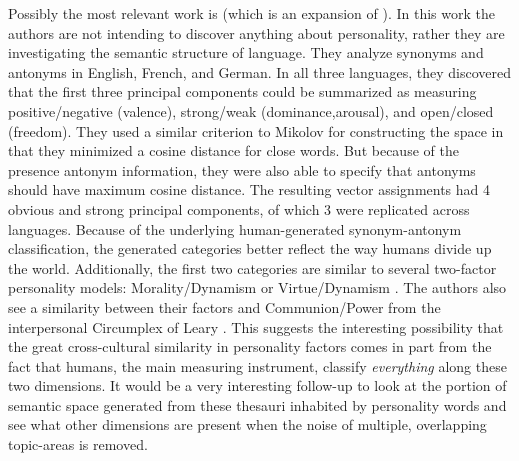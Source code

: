 Possibly the most relevant work is \citep{Samsonovich2010} (which is an
expansion of \citep{Samsonovich2007}). In this work the authors are not
intending to discover anything about personality, rather they are investigating 
the semantic structure of language. They
analyze synonyms and antonyms in English, French, and German. In all three
languages, they discovered that the first three principal components could be
summarized as measuring positive/negative (valence), strong/weak 
(dominance,arousal), and open/closed (freedom). They used a similar criterion
to Mikolov for constructing the space in that they minimized a cosine distance
for close words. But because of the presence antonym information, they were
also able to specify that antonyms should have maximum cosine distance.
The resulting vector assignments had 4 obvious and strong principal
components, of which 3 were replicated across languages. Because of the
underlying human-generated synonym-antonym classification, the generated
categories better reflect the way humans divide up the world. Additionally,
the first two categories are similar to several two-factor personality models:
Morality/Dynamism 
or Virtue/Dynamism . The authors also
see a similarity between their factors and Communion/Power from the 
interpersonal Circumplex of Leary . This suggests
the 
interesting possibility that the great cross-cultural similarity in personality
factors comes in part from the fact that humans, the main measuring instrument,
classify \textit{everything} along these two dimensions. It would be a very
interesting follow-up to look at the portion of semantic space generated
from these thesauri inhabited by personality words and see what other 
dimensions are present when the noise of multiple, overlapping topic-areas
is removed.
